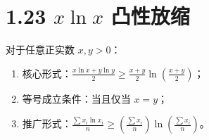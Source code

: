 \documentclass{article}
\begin{document}
\section*{1.23 \(x\ln x\) 凸性放缩}
对于任意正实数 \( x,y>0 \)：
\begin{enumerate}
    \item 核心形式：\( \frac{x\ln x+y\ln y}{2} \geq \frac{x+y}{2}\ln\!\left(\frac{x+y}{2}\right) \)；
    \item 等号成立条件：当且仅当 \( x=y \)；
    \item 推广形式：\( \frac{\sum x_i\ln x_i}{n} \geq \left(\frac{\sum x_i}{n}\right)\ln\!\left(\frac{\sum x_i}{n}\right) \)。
\end{enumerate}
\end{document}
